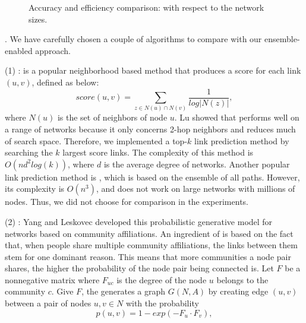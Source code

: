 {\begin{figure}[tb!]
  \quad\quad
  \quad\quad
  \vspace{-2ex}
  \caption{Accuracy and efficiency comparison: with respect to the network sizes.}\label{exp-n}
  \vspace{-3ex}
\end{figure}

} %

. We have carefully chosen a couple of algorithms
to compare with our ensemble-enabled approach.


  \noindent (1) \Adamic \cite{adamic}: \Aa is a popular neighborhood based method that
  produces a score for each link $(u, v)$, defined as below:
  \vspace{-2ex}
  \[ score(u, v) = \sum_{z \in N(u)\cap N(v)}\frac{1}{log|N(z)|}, \]
    \vspace{-.5ex}
  where $N(u)$ is the set of neighbors of node $u$. Lu \cite{linyuan-2011} showed that
  \Aa performs well on a range of networks because it only concerns 2-hop neighbors and
  reduces much of search space. Therefore, we implemented a top-$k$ link prediction
  method by searching the $k$ largest \Aa score links. The complexity of this method is
  $O(nd^2log(k))$, where $d$ is the average degree of networks. Another popular link
  prediction method is \Katz \cite{katz-1953}, which is based on the ensemble of all paths. However, its
  complexity is $O(n^3)$, and does not work on large networks with millions
  of nodes. Thus, we did not choose \Katz for comparison in the experiments.



  \noindent (2) \CAMBN \cite{yang-wsdm2013}:
  Yang and Leskovec developed this probabilistic generative model for networks
  based on community affiliations. An ingredient of \BIGCLAM is based on the fact that,
  when people share multiple community affiliations, the links between them stem for
  one dominant reason. This means that more communities a node pair shares,
  the higher the probability of the  node pair being connected is.
  Let $F$ be a nonnegative matrix where $F_{uc}$ is the degree of the node $u$ belongs to
  the community $c$. Give $F$, the \BIGCLAM generates a graph $G(N, A)$ by creating edge
  $(u, v)$ between a pair of nodes $u, v \in N$ with the probability
    \[ p(u, v) = 1 - exp(-F_u\cdot F_v), \]

